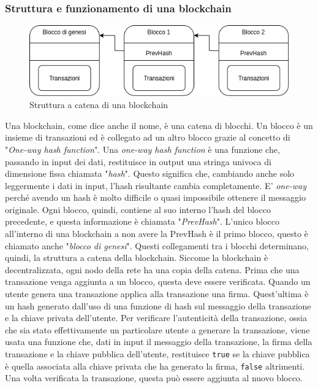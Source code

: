 \documentclass[a4paper]{article}
\begin{document}
    \subsubsection{Struttura e funzionamento di una blockchain}
    \label{blockchainFunc}
    \begin{figure}[ht]
      \includegraphics[scale=0.7, fbox]{blockchain.drawio.png}
      \centering
      \caption{Struttura a catena di una blockchain}
      \centering
      \label{fig:blockchainStruct}
    \end{figure}
    Una blockchain, come dice anche il nome, è una catena di blocchi. Un blocco è un insieme di transazioni ed è collegato ad un altro blocco grazie al concetto di "\emph{One-way hash function}".
    Una \emph{one-way hash function} è una funzione che, passando in input dei dati, restituisce in output una stringa univoca di dimensione fissa chiamata "\emph{hash}". Questo significa che, cambiando anche
    solo leggermente i dati in input, l'hash risultante cambia completamente. E' \emph{one-way} perché avendo un hash è molto difficile o quasi impossibile ottenere il messaggio originale.
    Ogni blocco, quindi, contiene al suo interno l'hash del blocco precedente, e questa informazione è chiamata "\emph{PrevHash}". L'unico blocco all'interno di una blockchain a non avere la PrevHash è il primo blocco,
    questo è chiamato anche "\emph{blocco di genesi}". Questi collegamenti tra i blocchi determinano, quindi, la struttura a catena della blockchain. Siccome la blockchain è decentralizzata, ogni nodo della rete ha una copia
    della catena. Prima che una transazione venga aggiunta a un blocco, questa deve essere verificata. Quando un utente genera una transazione applica alla transazione una firma. Quest'ultima è un hash generato dall'uso di una funzione di hash sul messaggio della transazione e la chiave privata dell'utente.
    Per verificare l'autenticità della transazione, ossia che sia stato effettivamente un particolare utente a generare la transazione, viene usata una funzione che, dati in input il messaggio della transazione, la firma della transazione e la chiave pubblica dell'utente, restituisce \verb|true| se la chiave pubblica
    è quella associata alla chiave privata che ha generato la firma, \verb|false| altrimenti. Una volta verificata la transazione, questa può essere aggiunta al nuovo blocco.
\end{document}
